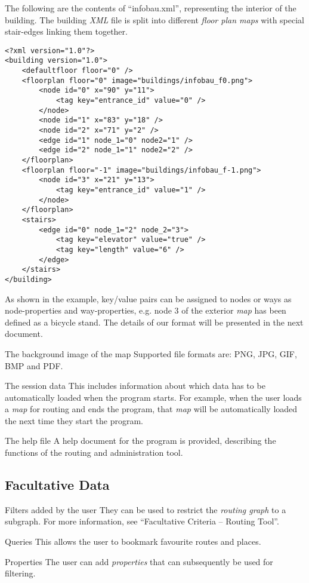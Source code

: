 \begin{numerate}[D]
	The following are the contents of ``infobau.xml'', representing the interior of the building. The building \textit{XML} file is split into different \textit{floor plan maps} with
	special stair-edges linking them together.

		\begin{minipage}{\textwidth}
	\lstset{language=XML}
	\begin{lstlisting}
<?xml version="1.0"?>
<building version="1.0">
	<defaultfloor floor="0" />
	<floorplan floor="0" image="buildings/infobau_f0.png">
		<node id="0" x="90" y="11">
			<tag key="entrance_id" value="0" />
		</node>
		<node id="1" x="83" y="18" />
		<node id="2" x="71" y="2" />
		<edge id="1" node_1="0" node2="1" />
		<edge id="2" node_1="1" node2="2" />
	</floorplan>
	<floorplan floor="-1" image="buildings/infobau_f-1.png">
		<node id="3" x="21" y="13">
			<tag key="entrance_id" value="1" />
		</node>
	</floorplan>
	<stairs>
		<edge id="0" node_1="2" node_2="3">
			<tag key="elevator" value="true" />
			<tag key="length" value="6" />
		</edge>
	</stairs>
</building>
	\end{lstlisting}
	\end{minipage}

	As shown in the example, key/value pairs can be assigned to nodes or ways as node-properties and way-properties, e.g. node 3 of the exterior \textit{map} has been defined as a bicycle stand.
	The details of our format will be presented in the next document.

	\item[The background image of the map] Supported file formats are: PNG, JPG, GIF, BMP and PDF.

	\item[The session data] This includes information about which data has to be automatically loaded when the program starts. For example, when the user loads a \textit{map} for routing and ends the program, that \textit{map} will be automatically loaded the next time they start the program.
	\item[The help file] A help document for the program is provided, describing the functions of the routing and administration tool.
\end{numerate}

\subsection{Facultative Data}
\begin{numerate}[FD]
	\item[Filters added by the user] They can be used to restrict the \textit{routing graph} to a subgraph. For more information, see ``Facultative Criteria -- Routing Tool''.

	\item[Queries] This allows the user to bookmark favourite routes and places.

	\item[Properties] The user can add \textit{properties} that can subsequently be used for filtering.
\end{numerate}
